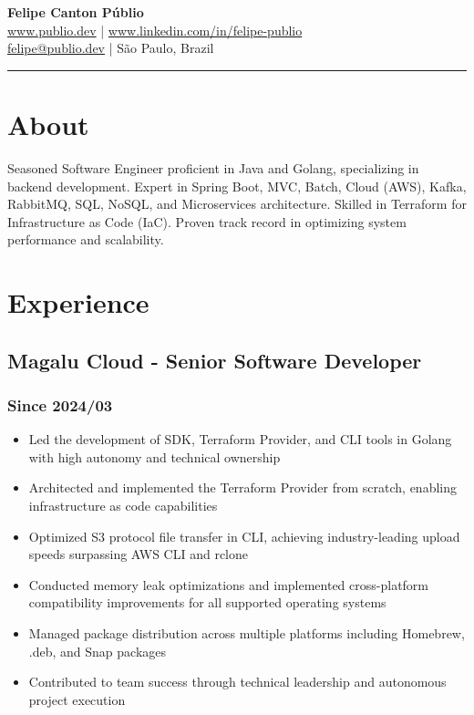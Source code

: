 \documentclass[a4paper,10pt]{article}
\begin{document}
\pagestyle{empty}

\begin{center}
    {\Huge \textbf{Felipe Canton Públio}} \\
    \vspace{4mm}
    \href{https://www.publio.dev}{www.publio.dev} | \href{https://www.linkedin.com/in/felipe-publio}{www.linkedin.com/in/felipe-publio} \\
    \vspace{2mm}
    \href{mailto:felipe@publio.dev}{felipe@publio.dev} | São Paulo, Brazil
\end{center}
\hrule %

\section*{About}
Seasoned Software Engineer proficient in Java and Golang, specializing in backend development. Expert in Spring Boot, MVC, Batch, Cloud (AWS), Kafka, RabbitMQ, SQL, NoSQL, and Microservices architecture. Skilled in Terraform for Infrastructure as Code (IaC). Proven track record in optimizing system performance and scalability.

\section*{Experience}

\subsection*{Magalu Cloud - Senior Software Developer}
\subsubsection*{Since 2024/03}
\begin{itemize}
\item Led the development of SDK, Terraform Provider, and CLI tools in Golang with high autonomy and technical ownership
\item Architected and implemented the Terraform Provider from scratch, enabling infrastructure as code capabilities
\item Optimized S3 protocol file transfer in CLI, achieving industry-leading upload speeds surpassing AWS CLI and rclone
\item Conducted memory leak optimizations and implemented cross-platform compatibility improvements for all supported operating systems
\item Managed package distribution across multiple platforms including Homebrew, .deb, and Snap packages
\item Contributed to team success through technical leadership and autonomous project execution
\end{itemize}
\end{document}
